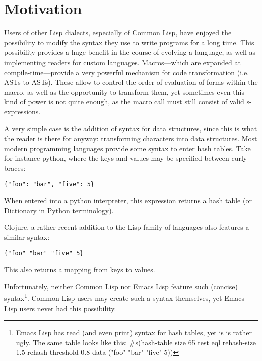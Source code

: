 \documentclass[a4paper,10pt,twoside]{article}
\newcommand{\el}{Emacs Lisp}
\newcommand{\cl}{Common Lisp}
\begin{document}
\section{Motivation}
\label{sec:motivation}
Users of other Lisp dialects, especially of \cl{}, have enjoyed the possibility
to modify the syntax they use to write programs for a long time.  This
possibility provides a huge benefit in the course of evolving a language, as
well as implementing readers for custom languages.  Macros---which are expanded
at compile-time---provide a very powerful mechanism for code transformation
(i.e. ASTs to ASTs).  These allow to control the order of evaluation of forms
within the macro, as well as the opportunity to transform them, yet sometimes
even this kind of power is not quite enough, as the macro call must still
consist of valid s-expressions.

A very simple case is the addition of syntax for data structures, since this is
what the reader is there for anyway: transforming characters into data
structures.  Most modern programming languages provide some syntax to enter hash
tables.  Take for instance python, where the keys and values may be specified
between curly braces:


\begin{lstlisting}[style=pythoncode]
{"foo": "bar", "five": 5}
\end{lstlisting}

When entered into a python interpreter, this expression returns a hash table (or
Dictionary in Python terminology).

Clojure, a rather recent addition to the Lisp family of languages also features
a similar syntax:


\begin{lstlisting}[style=lispinline]
{"foo" "bar" "five" 5}
\end{lstlisting}

This also returns a mapping from keys to values.

Unfortunately, neither \cl{} nor \el{} feature such (concise)
syntax\footnote{\el{} has read (and even print) syntax for hash tables, yet is
  is rather ugly.  The same table looks like this: \#s(hash-table size 65 test
  eql rehash-size 1.5 rehash-threshold 0.8 data ("foo" "bar" "five" 5))}.  \cl{}
users may create such a syntax themselves, yet \el{} users never had this
possibility.
\end{document}
